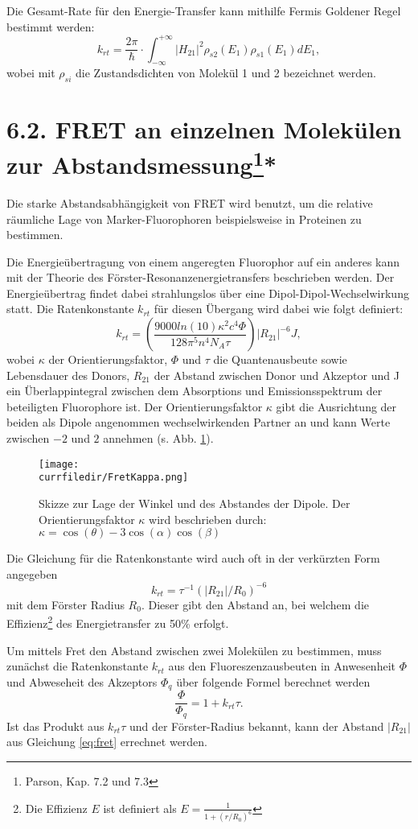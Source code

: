 Die Gesamt-Rate für den Energie-Transfer kann mithilfe Fermis Goldener Regel bestimmt werden:
\begin{equation*}
    k_{rt} = \frac{2\pi}{\hbar} \cdot \int_{-\infty}^{+\infty} |H_{21}|^2 \rho_{s2}(E_1) \rho_{s1}(E_1) dE_1,
\end{equation*}
wobei mit $\rho_{si}$ die Zustandsdichten von Molekül 1 und 2 bezeichnet werden.

\section{6.2. FRET an einzelnen Molekülen zur Abstandsmessung\protect\footnote{Parson, Kap. 7.2 und 7.3}\hfill **} 

Die starke Abstandsabhängigkeit von FRET wird benutzt, um
die relative räumliche Lage von Marker-Fluorophoren
beispielsweise in Proteinen zu bestimmen.

Die Energieübertragung von einem angeregten Fluorophor auf ein anderes kann mit der Theorie des Förster-Resonanzenergietransfers beschrieben werden. Der Energieübertrag findet dabei strahlungslos über eine Dipol-Dipol-Wechselwirkung statt. Die Ratenkonstante $k_{rt}$ für diesen Übergang wird dabei wie folgt definiert:
\begin{equation}
    k_{rt}=\left( \frac{9000 ln(10)\kappa^2c^4\Phi}{128\pi^5n^4N_A\tau} \right) |R_{21}|^{-6}J ,
\end{equation}
wobei $\kappa$ der Orientierungsfaktor, $\Phi$ und $\tau$ die Quantenausbeute sowie Lebensdauer des Donors, $R_{21}$ der Abstand zwischen Donor und Akzeptor und J ein Überlappintegral zwischen dem Absorptions und Emissionsspektrum der beteiligten Fluorophore ist. Der Orientierungsfaktor $\kappa$ gibt die Ausrichtung der beiden als Dipole angenommen wechselwirkenden Partner an und kann Werte zwischen $-2$ und $2$ annehmen (s. Abb. \ref{KappaFaktor}). 
\begin{figure}
\label{KappaFaktor}
\center
    \texttt{[image: \\currfiledir/FretKappa.png]}
    \caption{Skizze zur Lage der Winkel und des Abstandes der Dipole. Der Orientierungsfaktor $\kappa$ wird beschrieben durch: $\kappa=\cos(\theta)-3 \cos (\alpha)\cos (\beta)$}
\end{figure}
Die Gleichung für die Ratenkonstante wird auch oft in der verkürzten Form angegeben
\begin{equation}
\label{eq:fret}
    k_{rt}=\tau^{-1}(|R_{21}|/R_0)^{-6}
\end{equation}
mit dem Förster Radius $R_0$. Dieser gibt den Abstand an, bei welchem die Effizienz\footnote{Die Effizienz $E$ ist definiert als $E=\frac{1}{1+(r/R_0)^6}$ } des Energietransfer zu 50\% erfolgt.\par
Um mittels Fret den Abstand zwischen zwei Molekülen zu bestimmen, muss zunächst die Ratenkonstante $k_{rt}$ aus den Fluoreszenzausbeuten in Anwesenheit $\Phi$ und Abweseheit des Akzeptors $\Phi_q$ über folgende Formel berechnet werden 
\[ \frac{\Phi}{\Phi_q}=1+k_{rt}\tau .\]
Ist das Produkt aus $k_{rt}\tau$ und der Förster-Radius bekannt, kann der Abstand $|R_{21}|$ aus Gleichung \ref{eq:fret} errechnet werden.




\printbibliography[segment=\therefsegment,heading=subbibliography]
